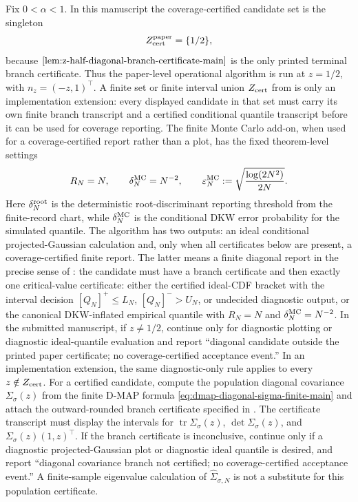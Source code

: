 Fix \(0<\alpha<1\).  In this manuscript the coverage-certified candidate set
is the singleton
\[
Z_{\rm cert}^{\rm paper}=\{1/2\},
\]
because \(\Cref{lem:z-half-diagonal-branch-certificate-main}\) is the only
printed terminal branch certificate.  Thus the paper-level operational
algorithm is run at \(z=1/2\), with \(n_z=(-z,1)^\top\).  A finite set or
finite interval union \(Z_{\rm cert}\) from
is only an implementation extension: every displayed candidate in that set
must carry its own finite branch transcript and a certified conditional
quantile transcript before it can be used for coverage reporting.  The finite
Monte Carlo add-on, when used for a coverage-certified report rather than a
plot, has the fixed theorem-level settings
\[
R_N=N,\qquad \delta_N^{\rm MC}=N^{-2},\qquad
\varepsilon_N^{\rm MC}:=\sqrt{\frac{\log(2N^2)}{2N}} .
\]
Here \(\delta_N^{\rm root}\) is the deterministic root-discriminant reporting
threshold from the finite-record chart, while \(\delta_N^{\rm MC}\) is the
conditional DKW error probability for the simulated quantile.
The algorithm has two outputs: an ideal conditional projected-Gaussian
calculation and, only when all certificates below are present, a
coverage-certified finite report.  The latter means a finite diagonal report
in the precise sense of : the candidate
must have a branch certificate and then exactly one critical-value certificate:
either the certified ideal-CDF bracket with the interval decision
\([Q_N]^+\le L_N\), \([Q_N]^->U_N\), or undecided diagnostic output, or the
canonical DKW-inflated empirical quantile with \(R_N=N\) and
\(\delta_N^{\rm MC}=N^{-2}\).  In the submitted manuscript, if
\(z\ne1/2\), continue only for diagnostic plotting or diagnostic
ideal-quantile evaluation and report ``diagonal candidate outside the printed
paper certificate; no coverage-certified acceptance event.''  In an
implementation extension, the same diagnostic-only rule applies to every
\(z\notin Z_{\rm cert}\).  For a certified candidate, compute the population diagonal
covariance \(\Sigma_\sigma(z)\) from the finite D-MAP formula
\eqref{eq:dmap-diagonal-sigma-finite-main} and attach the outward-rounded
branch certificate specified in
.
The certificate transcript must display the intervals for
\(\operatorname{tr}\Sigma_\sigma(z)\), \(\det\Sigma_\sigma(z)\), and
\(\Sigma_\sigma(z)(1,z)^\top\).  If the branch certificate is inconclusive,
continue only if a diagnostic projected-Gaussian plot or diagnostic ideal
quantile is desired, and report ``diagonal covariance branch not certified; no
coverage-certified acceptance event.''  A finite-sample eigenvalue calculation of
\(\widehat\Sigma_{\sigma,N}\) is not a substitute for this population
certificate.

